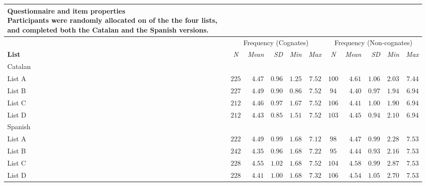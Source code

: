 \documentclass[
  english,
  man,man,floatsintext]{apa6}
\begin{document}
\captionsetup[table]{labelformat=empty,skip=1pt}
\begin{longtable}{lcrrrrcrrrr}
\caption*{
\large \textbf{Questionnaire and item properties}\\ 
\small Participants were randomly allocated on of the the four lists, and completed both the Catalan and the Spanish versions.\\ 
} \\ 
\toprule
& \multicolumn{5}{c}{Frequency (Cognates)} & \multicolumn{5}{c}{Frequency (Non-cognates)} \\ 
 \cmidrule(lr){2-6}\cmidrule(lr){7-11}
\textbf{List} & \emph{N} & \emph{Mean} & \emph{SD} & \emph{Min} & \emph{Max} & \emph{N} & \emph{Mean} & \emph{SD} & \emph{Min} & \emph{Max} \\ 
\midrule
\multicolumn{1}{l}{Catalan} \\ 
\midrule
List A & $225$ & $4.47$ & $0.96$ & $1.25$ & $7.52$ & $100$ & $4.61$ & $1.06$ & $2.03$ & $7.44$ \\ 
List B & $227$ & $4.49$ & $0.90$ & $0.86$ & $7.52$ & $94$ & $4.40$ & $0.97$ & $1.94$ & $6.94$ \\ 
List C & $212$ & $4.46$ & $0.97$ & $1.67$ & $7.52$ & $106$ & $4.41$ & $1.00$ & $1.90$ & $6.94$ \\ 
List D & $212$ & $4.43$ & $0.85$ & $1.51$ & $7.52$ & $103$ & $4.45$ & $0.94$ & $2.10$ & $6.94$ \\ 
\midrule
\multicolumn{1}{l}{Spanish} \\ 
\midrule
List A & $222$ & $4.49$ & $0.99$ & $1.68$ & $7.12$ & $98$ & $4.47$ & $0.99$ & $2.28$ & $7.53$ \\ 
List B & $242$ & $4.35$ & $0.96$ & $1.68$ & $7.22$ & $95$ & $4.44$ & $0.93$ & $2.16$ & $7.53$ \\ 
List C & $228$ & $4.55$ & $1.02$ & $1.68$ & $7.52$ & $104$ & $4.58$ & $0.99$ & $2.87$ & $7.53$ \\ 
List D & $228$ & $4.41$ & $1.00$ & $1.68$ & $7.32$ & $106$ & $4.54$ & $1.05$ & $2.70$ & $7.53$ \\ 
\bottomrule
\end{longtable}
\end{document}
